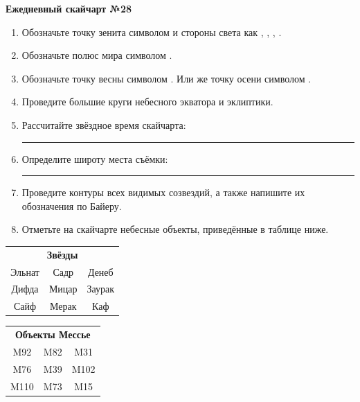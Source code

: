 \documentclass{./SAS-class-skygen}
\begin{document}
    
    
    
	\begin{center}
		\large\textbf{Ежедневный скайчарт №28}
	\end{center}

	\begin{enumerate}
		\item Обозначьте точку зенита символом  и стороны света как , , , .
		\item Обозначьте полюс мира символом .
		\item Обозначьте точку весны символом \Aries. Или же точку осени символом \Libra.
		\item Проведите большие круги небесного экватора и эклиптики.
		\item Рассчитайте звёздное время скайчарта: \rule{2cm}{0.4pt}
		\item Определите широту места съёмки: \rule{2cm}{0.4pt}
		\item Проведите контуры всех видимых созвездий, а также напишите их обозначения по Байеру.
		\item Отметьте на скайчарте небесные объекты, приведённые в таблице ниже.
	\end{enumerate}
	
    \vspace{0.5cm}

    \begin{table}[h!]
    \centering
    \begin{tabular}{ccc}
    \multicolumn{3}{c}{\textbf{Звёзды}} \\ Эльнат & Садр & Денеб \\
Дифда & Мицар & Заурак \\
Сайф & Мерак & Каф \\

\end{tabular}
    \hfill
    \begin{tabular}{ccc}
    \multicolumn{3}{c}{\textbf{Объекты Мессье}} \\ M92 & M82 & M31 \\
M76 & M39 & M102 \\
M110 & M73 & M15 \\

\end{tabular}
    \end{table}
	
\end{document}
